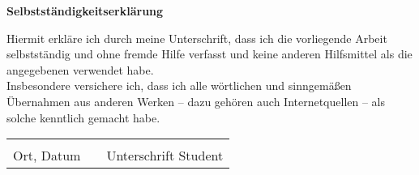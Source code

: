 \begin{centering}
\textbf{\Huge Selbstständigkeitserklärung}\\
\end{centering}
\vspace{1.5cm}
\begin{doublespacing}
Hiermit erkläre ich durch meine Unterschrift, dass ich die vorliegende Arbeit selbstständig und ohne fremde Hilfe verfasst und keine anderen Hilfsmittel als die angegebenen verwendet habe.\\

Insbesondere versichere ich, dass ich alle wörtlichen und sinngemäßen Übernahmen aus anderen Werken – dazu gehören auch Internetquellen – als solche kenntlich gemacht habe.\\
\end{doublespacing}
\vspace{2cm}

\begin{tabular}{lp{12em}l}
\hspace{5cm}  && \hspace{5cm} \\\cline{1-1}\cline{3-3}
Ort, Datum    && Unterschrift Student
\end{tabular}\\

